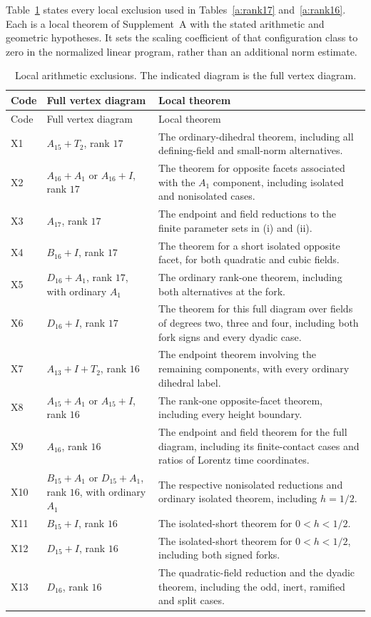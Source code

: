 \documentclass[11pt]{article}
\theoremstyle{definition}
\theoremstyle{remark}
\numberwithin{equation}{section}
\begin{document}
Table~\ref{a:local-exits} states every local exclusion used in
Tables~\ref{a:rank17} and~\ref{a:rank16}. Each is a local theorem
of Supplement~A with the stated arithmetic and geometric hypotheses.
It sets the scaling coefficient of that configuration class to zero in the normalized
linear program, rather than an additional norm estimate.

\begin{longtable}{>{\raggedright\arraybackslash}p{.07\linewidth}
 >{\raggedright\arraybackslash}p{.31\linewidth}
 >{\raggedright\arraybackslash}p{.52\linewidth}}
\caption{Local arithmetic exclusions. The indicated diagram is the full vertex diagram.}\label{a:local-exits}\\
\toprule
Code&Full vertex diagram&Local theorem\\\midrule
\endfirsthead
\toprule Code&Full vertex diagram&Local theorem\\\midrule\endhead
X1&$A_{15}+T_2$, rank $17$&The ordinary-dihedral theorem, including all defining-field and small-norm alternatives.\\
X2&$A_{16}+A_1$ or $A_{16}+I$, rank $17$&The theorem for opposite facets associated with the $A_1$ component, including isolated and nonisolated cases.\\
X3&$A_{17}$, rank $17$&The endpoint and field reductions to the finite parameter sets in (i) and (ii).\\
X4&$B_{16}+I$, rank $17$&The theorem for a short isolated opposite facet, for both quadratic and cubic fields.\\
X5&$D_{16}+A_1$, rank $17$, with ordinary $A_1$&The ordinary rank-one theorem, including both alternatives at the fork.\\
X6&$D_{16}+I$, rank $17$&The theorem for this full diagram over fields of degrees two, three and four, including both fork signs and every dyadic case.\\
X7&$A_{13}+I+T_2$, rank $16$&The endpoint theorem involving the remaining components, with every ordinary dihedral label.\\
X8&$A_{15}+A_1$ or $A_{15}+I$, rank $16$&The rank-one opposite-facet theorem, including every height boundary.\\
X9&$A_{16}$, rank $16$&The endpoint and field theorem for the full diagram, including its finite-contact cases and ratios of Lorentz time coordinates.\\
X10&$B_{15}+A_1$ or $D_{15}+A_1$, rank $16$, with ordinary $A_1$&
 The respective nonisolated reductions and ordinary isolated theorem, including $h=1/2$.\\
X11&$B_{15}+I$, rank $16$&The isolated-short theorem
 for $0<h<1/2$.\\
X12&$D_{15}+I$, rank $16$&The isolated-short theorem
 for $0<h<1/2$, including both signed forks.\\
X13&$D_{16}$, rank $16$&The quadratic-field reduction and the dyadic theorem, including the odd, inert, ramified and split cases.\\\bottomrule
\end{longtable}
\end{document}
